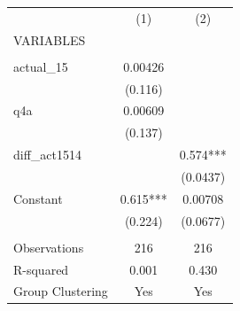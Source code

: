 \documentclass[]{article}
\begin{document}
\begin{tabular}{lcc} \hline
 & (1) & (2) \\
VARIABLES &  &  \\ \hline
 &  &  \\
actual\_15 & 0.00426 &  \\
 & (0.116) &  \\
q4a & 0.00609 &  \\
 & (0.137) &  \\
diff\_act1514 &  & 0.574*** \\
 &  & (0.0437) \\
Constant & 0.615*** & 0.00708 \\
 & (0.224) & (0.0677) \\
 &  &  \\
Observations & 216 & 216 \\
R-squared & 0.001 & 0.430 \\
 Group Clustering & Yes & Yes \\ \hline
\end{tabular}
\end{document}

